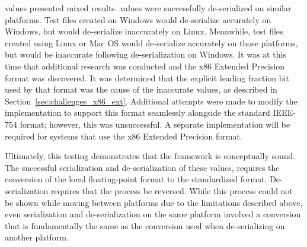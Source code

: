  values presented mixed results.  values were successfully de-serialized on similar platforms. Test files created on Windows would de-serialize accurately on Windows, but would de-serialize inaccurately on Linux. Meanwhile, test files created using Linux or Mac OS would de-serialize accurately on those platforms, but would be inaccurate following de-serialization on Windows. It was at this time that additional research was conducted and the x86 Extended Precision format was discovered. It was determined that the explicit leading fraction bit used by that format was the cause of the inaccurate values, as described in Section~\ref{sec:challenges_x86_ext}. Additional attempts were made to modify the implementation to support this format seamlessly alongside the standard IEEE-754 format; however, this was unsuccessful. A separate implementation will be required for systems that use the x86 Extended Precision format.

Ultimately, this testing demonstrates that the framework is conceptually sound. The successful serialization and de-serialization of these values, requires the conversion of the local floating-point format to the standardized format. De-serialization requires that the process be reversed. While this process could not be shown while moving between platforms due to the limitations described above, even serialization and de-serialization on the same platform involved a conversion that is fundamentally the same as the conversion used when de-serializing on another platform.